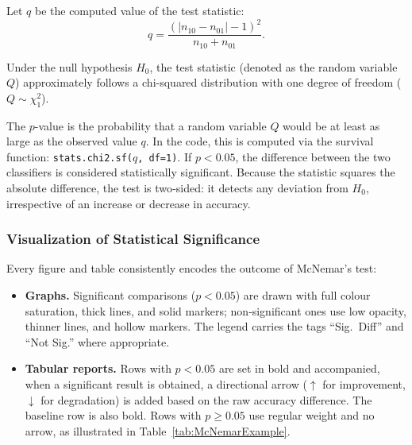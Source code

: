 \documentclass[a4paper,fleqn]{cas-dc}
\newcommand{\code}[1]{\texttt{#1}}
\newcommand{\mcnemarp}{p}
\newcommand{\mcnemarchi}{\chi^2}
\newcommand{\mcnemarstat}{q}
\newcommand{\mcnemarstatrand}{Q}
\newcommand{\missclassified}[1]{n_{#1}}
\newcommand{\nullhypo}{H_0}
\begin{document}
Let $\mcnemarstat$ be the computed value of the test statistic:
\begin{equation}
	\mcnemarstat = \frac{(|\missclassified{10} - \missclassified{01}| - 1)^2}{\missclassified{10} + \missclassified{01}}.
\end{equation}

Under the null hypothesis $\nullhypo$, the test statistic (denoted as the random variable $\mcnemarstatrand$) approximately follows a chi-squared distribution with one degree of freedom ($\mcnemarstatrand \sim \mcnemarchi_1$).

The $\mcnemarp$-value is the probability that a random variable $\mcnemarstatrand$ would be at least as large as the observed value $\mcnemarstat$.
In the code, this is computed via the survival function: \code{stats.chi2.sf(}$\mcnemarstat$\code{, df=1)}.
If $\mcnemarp < 0.05$, the difference between the two classifiers is considered statistically significant.
Because the statistic squares the absolute difference, the test is two‑sided: it detects any deviation from $\nullhypo$, irrespective of an increase or decrease in accuracy.

\subsubsection{Visualization of Statistical Significance}

Every figure and table consistently encodes the outcome of McNemar’s test:

\begin{itemize}
	\item \textbf{Graphs.} Significant comparisons ($p < 0.05$) are drawn with full colour saturation, thick lines, and solid markers; non‑significant ones use low opacity, thinner lines, and hollow markers. The legend carries the tags “Sig.\ Diff” and “Not Sig.” where appropriate.
	\item \textbf{Tabular reports.} Rows with $p < 0.05$ are set in bold and accompanied, when a significant result is obtained, a directional arrow ($\uparrow$ for improvement, $\downarrow$ for degradation) is added based on the raw accuracy difference. The baseline row is also bold. Rows with $p \ge 0.05$ use regular weight and no arrow, as illustrated in Table~\ref{tab:McNemarExample}.
\end{itemize}
\end{document}
